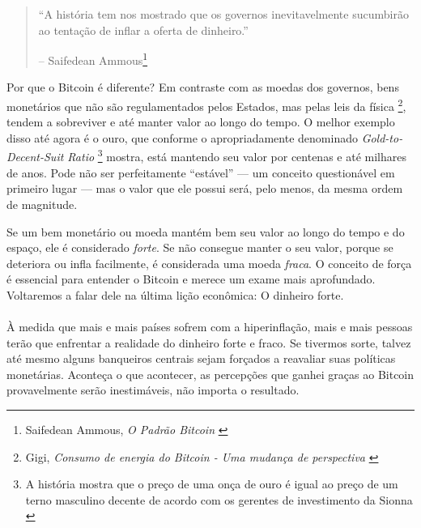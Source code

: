 \begin{quotation}\begin{samepage}
\enquote{A história tem nos mostrado que os governos inevitavelmente sucumbirão ao
tentação de inflar a oferta de dinheiro.}
\begin{flushright} -- Saifedean Ammous\footnote{Saifedean Ammous, \textit{O Padrão Bitcoin} \cite{bitcoin-standard}}
\end{flushright}\end{samepage}\end{quotation}

\newpage

Por que o Bitcoin é diferente? Em contraste com as moedas dos governos, bens monetários que não são regulamentados pelos Estados, mas pelas leis da física \footnote{Gigi, \textit{Consumo de energia do Bitcoin - Uma mudança de perspectiva} \cite {gigi:energy}}, tendem a sobreviver e até manter valor ao longo do tempo. O melhor exemplo disso até agora é o ouro, que conforme o apropriadamente denominado \textit{Gold-to-Decent-Suit Ratio} \footnote{A história mostra que o preço de uma onça de ouro é igual ao preço de um terno masculino decente de acordo com os gerentes de investimento da Sionna \cite{web:gold-to-decent-suite-ratio}} mostra, está mantendo seu valor por centenas e até milhares de anos. Pode não ser perfeitamente \enquote{estável} --- um conceito questionável em primeiro lugar --- mas o valor que ele possui será, pelo menos, da mesma ordem de magnitude.

Se um bem monetário ou moeda mantém bem seu valor ao longo do tempo e do espaço, ele é considerado \textit{forte}. Se não consegue manter o seu valor, porque se deteriora ou infla facilmente, é considerada uma moeda \textit{fraca}. O conceito de força é essencial para entender o Bitcoin e merece um exame mais aprofundado. Voltaremos a falar dele na última lição econômica: O dinheiro forte.

\paragraph{}
À medida que mais e mais países sofrem com a hiperinflação, mais e mais pessoas terão que enfrentar a realidade do dinheiro forte e fraco. Se tivermos sorte, talvez até mesmo alguns banqueiros centrais sejam forçados a reavaliar suas políticas monetárias. Aconteça o que acontecer, as percepções que ganhei graças ao Bitcoin provavelmente serão inestimáveis, não importa o resultado.

